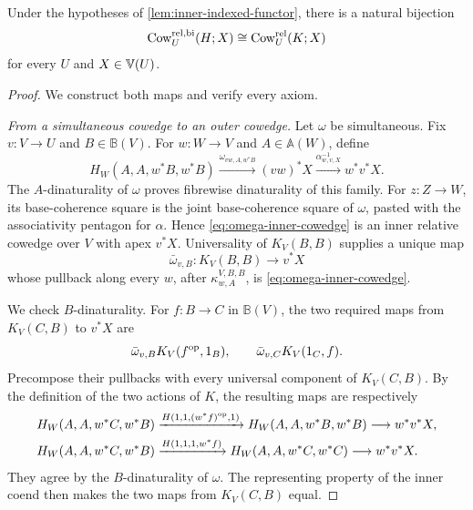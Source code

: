 \begin{proposition}
\label{prop:cowedge-currying}
Under the hypotheses of \cref{lem:inner-indexed-functor}, there is a natural
bijection
\begin{equation}
  \operatorname{Cow}^{\mathrm{rel},\mathrm{bi}}_U(H;X)
  \cong
  \operatorname{Cow}^{\mathrm{rel}}_U(K;X)
  \label{eq:cowedge-currying}
\end{equation}
for every \(U\) and \(X\in\mathbb{V}(U)\).
\end{proposition}

\begin{proof}
We construct both maps and verify every axiom.

\emph{From a simultaneous cowedge to an outer cowedge.}
Let \(\omega\) be simultaneous.  Fix \(v:V\to U\) and
\(B\in\mathbb B(V)\).  For \(w:W\to V\) and
\(A\in\mathbb A(W)\), define
\begin{equation}
  H_W(A,A,w^*B,w^*B)
  \xrightarrow{\omega_{vw,A,w^*B}}(vw)^*X
  \xrightarrow{\alpha^{-1}_{w,v,X}}w^*v^*X.
  \label{eq:omega-inner-cowedge}
\end{equation}
The \(A\)-dinaturality of \(\omega\) proves fibrewise dinaturality of this
family.  For \(z:Z\to W\), its base-coherence square is the joint
base-coherence square of \(\omega\), pasted with the associativity pentagon
for \(\alpha\).  Hence \cref{eq:omega-inner-cowedge} is an inner relative
cowedge over \(V\) with apex \(v^*X\).  Universality of \(K_V(B,B)\)
supplies a unique map
\begin{equation}
  \bar\omega_{v,B}:K_V(B,B)\longrightarrow v^*X
  \label{eq:baromega}
\end{equation}
whose pullback along every \(w\), after \(\kappa^{V,B,B}_{w,A}\), is
\cref{eq:omega-inner-cowedge}.

We check \(B\)-dinaturality.  For \(f:B\to C\) in \(\mathbb B(V)\), the
two required maps from \(K_V(C,B)\) to \(v^*X\) are
\[
  \bar\omega_{v,B}K_V(f^{\mathrm{op}},1_B),
  \qquad
  \bar\omega_{v,C}K_V(1_C,f).
\]
Precompose their pullbacks with every universal component of
\(K_V(C,B)\).  By the definition of the two actions of \(K\), the resulting
maps are respectively
\begin{align*}
  H_W(A,A,w^*C,w^*B)
  &\xrightarrow{H(1,1,(w^*f)^{\mathrm{op}},1)}
  H_W(A,A,w^*B,w^*B)
  \longrightarrow w^*v^*X,\\
  H_W(A,A,w^*C,w^*B)
  &\xrightarrow{H(1,1,1,w^*f)}
  H_W(A,A,w^*C,w^*C)
  \longrightarrow w^*v^*X.
\end{align*}
They agree by the \(B\)-dinaturality of \(\omega\).  The representing
property of the inner coend then makes the two maps from \(K_V(C,B)\)
equal.


\end{proof}
